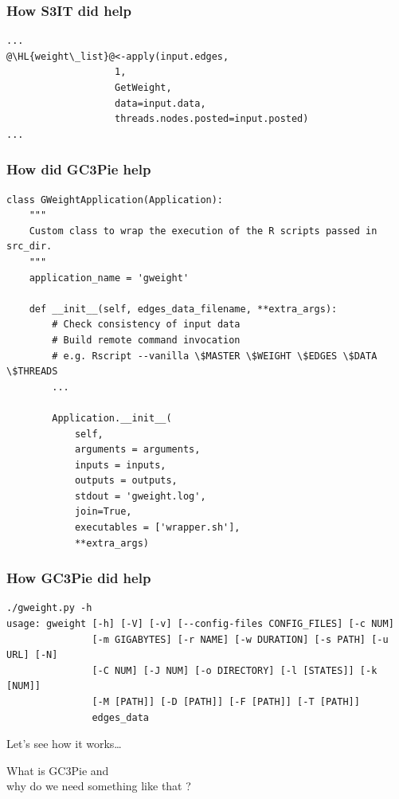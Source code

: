 \documentclass[english,serif,mathserif,xcolor=pdftex,dvipsnames,table]{beamer}
\begin{document}
\begin{frame}[fragile]
  \frametitle{How S3IT did help}
\begin{lstlisting}[showstringspaces=false,basicstyle=\scriptsize\ttfamily]
...
@\HL{weight\_list}@<-apply(input.edges,
                   1,
                   GetWeight,
                   data=input.data, 
                   threads.nodes.posted=input.posted)
...
\end{lstlisting}

\end{frame}

\begin{frame}[fragile]
  \frametitle{How did GC3Pie help}

\begin{lstlisting}[showstringspaces=false,basicstyle=\tiny\ttfamily]
class GWeightApplication(Application):
    """
    Custom class to wrap the execution of the R scripts passed in src_dir.
    """
    application_name = 'gweight'

    def __init__(self, edges_data_filename, **extra_args):
        # Check consistency of input data
        # Build remote command invocation
        # e.g. Rscript --vanilla \$MASTER \$WEIGHT \$EDGES \$DATA \$THREADS
        ...

        Application.__init__(
            self,
            arguments = arguments,
            inputs = inputs,
            outputs = outputs,
            stdout = 'gweight.log',
            join=True,
            executables = ['wrapper.sh'],
            **extra_args)
\end{lstlisting}

\end{frame}

\begin{frame}[fragile]
  \frametitle{How GC3Pie did help}
\begin{lstlisting}[showstringspaces=false,basicstyle=\tiny\ttfamily]
./gweight.py -h
usage: gweight [-h] [-V] [-v] [--config-files CONFIG_FILES] [-c NUM]
               [-m GIGABYTES] [-r NAME] [-w DURATION] [-s PATH] [-u URL] [-N]
               [-C NUM] [-J NUM] [-o DIRECTORY] [-l [STATES]] [-k [NUM]]
               [-M [PATH]] [-D [PATH]] [-F [PATH]] [-T [PATH]]
               edges_data
\end{lstlisting}
Let's see how it works\dots
\end{frame}

\begin{frame}
  \begin{center}
    \huge{What is {\color{Blue} GC3Pie} and \\ why do we need something like that ?}
  \end{center}
\end{frame}
\end{document}
